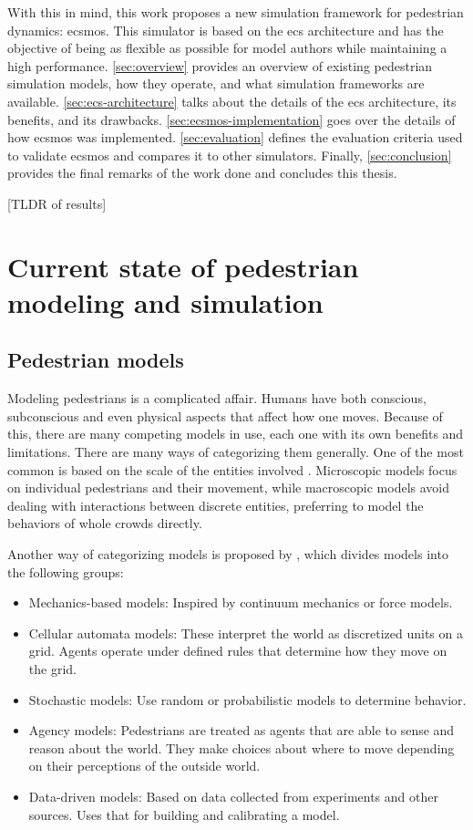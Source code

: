 \documentclass[twoside, 11pt]{article}
\begin{document}
With this in mind, this work proposes a new simulation framework for pedestrian dynamics: \gls{ecsmos}. This simulator is based on the \gls{ecs} architecture and has the objective of being as flexible as possible for model authors while maintaining a high performance. \autoref{sec:overview} provides an overview of existing pedestrian simulation models, how they operate, and what simulation frameworks are available. \autoref{sec:ecs-architecture} talks about the details of the \gls{ecs} architecture, its benefits, and its drawbacks. \autoref{sec:ecsmos-implementation} goes over the details of how \gls{ecsmos} was implemented. \autoref{sec:evaluation} defines the evaluation criteria used to validate \gls{ecsmos} and compares it to other simulators. Finally, \autoref{sec:conclusion} provides the final remarks of the work done and concludes this thesis.

[TLDR of results]

\section{Current state of pedestrian modeling and simulation} \label{sec:overview}

\subsection{Pedestrian models}

Modeling pedestrians is a complicated affair. Humans have both conscious, subconscious and even physical aspects that affect how one moves. Because of this, there are many competing models in use, each one with its own benefits and limitations. There are many ways of categorizing them generally. One of the most common is based on the scale of the entities involved \cite{kleinmeierVadereOpenSourceSimulation2019}. Microscopic models focus on individual pedestrians and their movement, while macroscopic models avoid dealing with interactions between discrete entities, preferring to model the behaviors of whole crowds directly.

Another way of categorizing models is proposed by \cite{martinez-gilModelingEvaluationScale2017}, which divides models into the following groups:

\begin{itemize}
  \item Mechanics-based models: Inspired by continuum mechanics or force models.
  \item Cellular automata models: These interpret the world as discretized units on a grid. Agents operate under defined rules that determine how they move on the grid.
  \item Stochastic models: Use random or probabilistic models to determine behavior.
  \item Agency models: Pedestrians are treated as agents that are able to sense and reason about the world. They make choices about where to move depending on their perceptions of the outside world.
  \item Data-driven models: Based on data collected from experiments and other sources. Uses that for building and calibrating a model.
\end{itemize}
\end{document}
